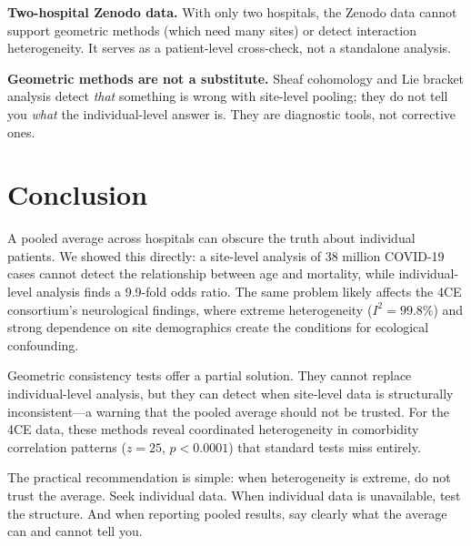 \documentclass{article}
\begin{document}
\textbf{Two-hospital Zenodo data.}  With only two hospitals, the Zenodo data
cannot support geometric methods (which need many sites) or detect interaction
heterogeneity.  It serves as a patient-level cross-check, not a standalone
analysis.

\textbf{Geometric methods are not a substitute.}  Sheaf cohomology and Lie
bracket analysis detect \emph{that} something is wrong with site-level
pooling; they do not tell you \emph{what} the individual-level answer is.
They are diagnostic tools, not corrective ones.


\section{Conclusion}

A pooled average across hospitals can obscure the truth about individual
patients.  We showed this directly: a site-level analysis of 38 million
COVID-19 cases cannot detect the relationship between age and mortality, while
individual-level analysis finds a 9.9-fold odds ratio.  The same problem
likely affects the 4CE consortium's neurological findings, where extreme
heterogeneity ($I^2 = 99.8\%$) and strong dependence on site demographics
create the conditions for ecological confounding.

Geometric consistency tests offer a partial solution.  They cannot replace
individual-level analysis, but they can detect when site-level data is
structurally inconsistent---a warning that the pooled average should not be
trusted.  For the 4CE data, these methods reveal coordinated heterogeneity
in comorbidity correlation patterns ($z = 25$, $p < 0.0001$) that standard
tests miss entirely.

The practical recommendation is simple: when heterogeneity is extreme, do not
trust the average.  Seek individual data.  When individual data is
unavailable, test the structure.  And when reporting pooled results, say
clearly what the average can and cannot tell you.




\end{document}
